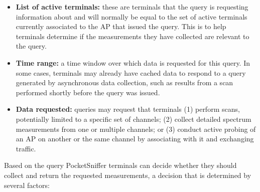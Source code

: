 \begin{itemize}

\item \textbf{List of active terminals:} these are terminals that the query
is requesting information about and will normally be equal to the set of
active terminals currently associated to the AP that issued the query. This
is to help terminals determine if the measurements they have collected are
relevant to the query.

\item \textbf{Time range:} a time window over which data is requested for
this query. In some cases, terminals may already have cached data to respond
to a query generated by asynchronous data collection, such as results from a
scan performed shortly before the query was issued.

\item \textbf{Data requested:} queries may request that terminals (1) perform
scans, potentially limited to a specific set of channels; (2) collect
detailed spectrum measurements from one or multiple channels; or (3) conduct
active probing of an AP on another or the same channel by associating with it
and exchanging traffic.

\end{itemize}

Based on the query PocketSniffer terminals can decide whether they should
collect and return the requested measurements, a decision that is determined
by several factors:

